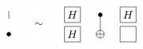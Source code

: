 \documentclass[a4paper,12pt,fleqn]{article}
\begin{document}
\begin{figure}
\begin{equation}
{\begin{tikzpicture}[scale=1.200000,x=1pt,y=1pt]
\begin{scope}
\draw (9.000000, 12.000000) -- (9.000000, 18.000000);
\end{scope}
\filldraw (9.000000, 0.000000) circle(1.500000pt);
\draw[fill=white,color=white] (24.000000, -6.000000) rectangle (39.000000, 21.000000);
\draw (31.500000, 7.500000) node {$\sim$};
\begin{scope}
\draw[fill=white] (57.000000, 15.000000) +(-45.000000:8.485281pt and 8.485281pt) -- +(45.000000:8.485281pt and 8.485281pt) -- +(135.000000:8.485281pt and 8.485281pt) -- +(225.000000:8.485281pt and 8.485281pt) -- cycle;
\clip (57.000000, 15.000000) +(-45.000000:8.485281pt and 8.485281pt) -- +(45.000000:8.485281pt and 8.485281pt) -- +(135.000000:8.485281pt and 8.485281pt) -- +(225.000000:8.485281pt and 8.485281pt) -- cycle;
\draw (57.000000, 15.000000) node {$H$};
\end{scope}
\begin{scope}
\draw[fill=white] (57.000000, -0.000000) +(-45.000000:8.485281pt and 8.485281pt) -- +(45.000000:8.485281pt and 8.485281pt) -- +(135.000000:8.485281pt and 8.485281pt) -- +(225.000000:8.485281pt and 8.485281pt) -- cycle;
\clip (57.000000, -0.000000) +(-45.000000:8.485281pt and 8.485281pt) -- +(45.000000:8.485281pt and 8.485281pt) -- +(135.000000:8.485281pt and 8.485281pt) -- +(225.000000:8.485281pt and 8.485281pt) -- cycle;
\draw (57.000000, -0.000000) node {$H$};
\end{scope}
\draw (78.000000,15.000000) -- (78.000000,0.000000);
\begin{scope}
\draw[fill=white] (78.000000, 0.000000) circle(3.000000pt);
\clip (78.000000, 0.000000) circle(3.000000pt);
\draw (75.000000, 0.000000) -- (81.000000, 0.000000);
\draw (78.000000, -3.000000) -- (78.000000, 3.000000);
\end{scope}
\filldraw (78.000000, 15.000000) circle(1.500000pt);
\begin{scope}
\draw[fill=white] (99.000000, 15.000000) +(-45.000000:8.485281pt and 8.485281pt) -- +(45.000000:8.485281pt and 8.485281pt) -- +(135.000000:8.485281pt and 8.485281pt) -- +(225.000000:8.485281pt and 8.485281pt) -- cycle;
\clip (99.000000, 15.000000) +(-45.000000:8.485281pt and 8.485281pt) -- +(45.000000:8.485281pt and 8.485281pt) -- +(135.000000:8.485281pt and 8.485281pt) -- +(225.000000:8.485281pt and 8.485281pt) -- cycle;
\draw (99.000000, 15.000000) node {$H$};
\end{scope}
\begin{scope}
\draw[fill=white] (99.000000, -0.000000) +(-45.000000:8.485281pt and 8.485281pt) -- +(45.000000:8.485281pt and 8.485281pt) -- +(135.000000:8.485281pt and 8.485281pt) -- +(225.000000:8.485281pt and 8.485281pt) -- cycle;

\end{scope}
\end{tikzpicture}}
\end{equation}
\end{figure}
\end{document}
